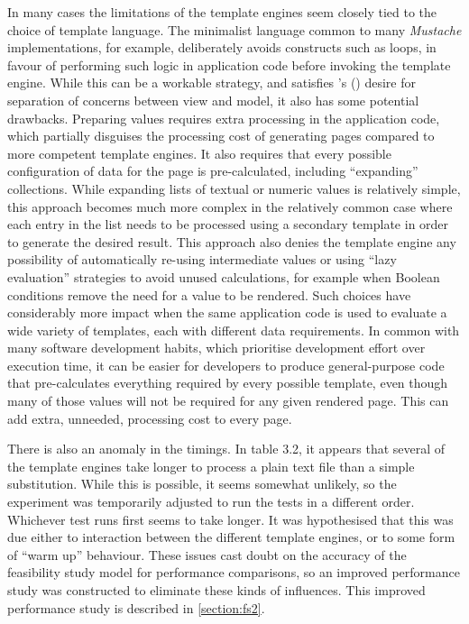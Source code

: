 In many cases the limitations of the \gls{template engine}s seem closely tied to the choice of \gls{template language}. The minimalist language common to many \emph{Mustache} implementations, for example, deliberately avoids constructs such as loops, in favour of performing such logic in application code before invoking the \gls{template engine}. While this can be a workable strategy, and satisfies \citeauthor{Parr2004}'s (\citeyear{Parr2004}) desire for separation of concerns between view and model, it also has some potential drawbacks. Preparing values requires extra processing in the application code, which partially disguises the processing cost of generating pages compared to more competent \gls{template engine}s. It also requires that every possible configuration of data for the page is pre-calculated, including \enquote{expanding} collections. While expanding lists of textual or numeric values is relatively simple, this approach becomes much more complex in the relatively common case where each entry in the list needs to be processed using a secondary template in order to generate the desired result. This approach also denies the \gls{template engine} any possibility of automatically re-using intermediate values or using \enquote{lazy evaluation} strategies to avoid unused calculations, for example when Boolean conditions remove the need for a value to be rendered. Such choices have considerably more impact when the same application code is used to evaluate a wide variety of templates, each with different data requirements. In common with many software development habits, which prioritise development effort over execution time, it can be easier for developers to produce general-purpose code that pre-calculates everything required by every possible template, even though many of those values will not be required for any given rendered page. This can add extra, unneeded, processing cost to every page.

\label{A126}
There is also an anomaly in the timings. In table 3.2, it appears that several of the \gls{template engine}s take longer to process a plain text file than a simple substitution. While this is possible, it seems somewhat unlikely, so the experiment was temporarily adjusted to run the tests in a different order. Whichever test runs first seems to take longer. It was hypothesised that this was due either to interaction between the different template engines, or to some form of \enquote{warm up} behaviour. These issues cast doubt on the accuracy of the feasibility study model for performance comparisons, so an improved performance study was constructed to eliminate these kinds of influences. This improved performance study is described in \autoref{section:fs2}.

